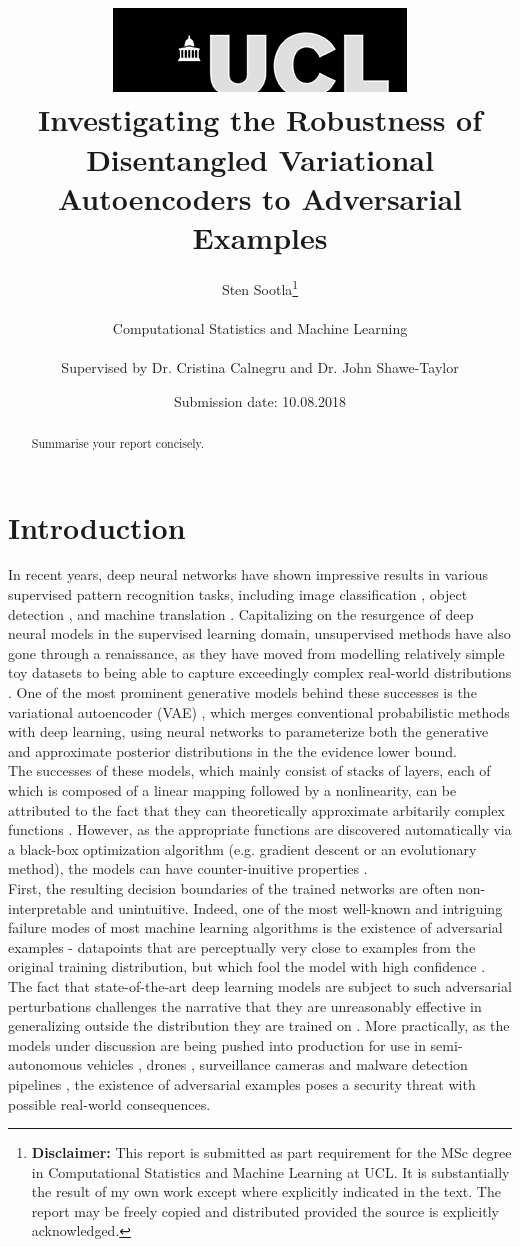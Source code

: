 \documentclass{report}
\title{{ \includegraphics[scale=.5,natwidth=294,natheight=84]{ucl_logo}}\\
{{\Huge Investigating the Robustness of Disentangled Variational Autoencoders to Adversarial Examples}}\\}
\date{Submission date: 10.08.2018}
\author{Sten Sootla\thanks{
{\bf Disclaimer:}
This report is submitted as part requirement for the MSc degree in Computational Statistics and Machine Learning at UCL. It is substantially the result of my own work except where explicitly indicated in the text. The report may be freely copied and distributed provided the source is explicitly acknowledged.}
\\ \\
Computational Statistics and Machine Learning\\ \\
Supervised by Dr. Cristina Calnegru and Dr. John Shawe-Taylor
}
\begin{document}
 
\onehalfspacing
\maketitle
\begin{abstract}
Summarise your report concisely.
\end{abstract}
\tableofcontents
\setcounter{page}{1}


\chapter{Introduction}



\noindent In recent years, deep neural networks have shown impressive results in various supervised pattern recognition tasks, including image classification \cite{alexnet, resnet}, object detection \cite{rcnn}, and machine translation \cite{nmt}. Capitalizing on the resurgence of deep neural models in the supervised learning domain, unsupervised methods have also gone through a renaissance, as they have moved from modelling relatively simple toy datasets to being able to capture exceedingly complex real-world distributions \cite{began, musicvae}. One of the most prominent generative models behind these successes is the variational autoencoder (VAE) \cite{vae}, which merges conventional probabilistic methods with deep learning, using neural networks to parameterize both the generative and approximate posterior distributions in the the evidence lower bound. \\

\noindent The successes of these models, which mainly consist of stacks of layers, each of which is composed of a linear mapping followed by a nonlinearity, can be attributed to the fact that they can theoretically approximate arbitarily complex functions \cite{Cybenko1989}. However, as the appropriate functions are discovered automatically via a black-box optimization algorithm (e.g. gradient descent or an evolutionary method), the models can have counter-inuitive properties \cite{intriguing-properties}. \\

\noindent First, the resulting decision boundaries of the trained networks are often non-interpretable and unintuitive. Indeed, one of the most well-known and intriguing failure modes of most machine learning algorithms is the existence of adversarial examples - datapoints that are perceptually very close to examples from the original training distribution, but which fool the model with high confidence \cite{intriguing-properties}. The fact that state-of-the-art deep learning models are subject to such adversarial perturbations challenges the narrative that they are unreasonably effective in generalizing outside the distribution they are trained on \cite{bengio-deep-architectures}. More practically, as the models under discussion are being pushed into production for use in semi-autonomous vehicles \cite{nvidia-self-driving-cars}, drones \cite{drones}, surveillance cameras \cite{surveillance-cameras} and malware detection pipelines \cite{malware}, the existence of adversarial examples poses a security threat with possible real-world consequences. \\
\end{document}
